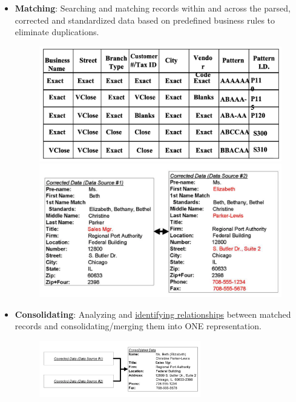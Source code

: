 \documentclass[10pt,a4paper]{article}
\begin{document}
\begin{itemize}
 \pagebreak
	\item \textbf{Matching}: Searching and matching records within and across the parsed, corrected and standardized data based on predefined business rules to eliminate duplications.
	 \begin{figure}[h!]
\begin{minipage}{.5\textwidth}
  \centering
  \includegraphics[width=.8\linewidth]{images/step-matching}
\end{minipage}%
\begin{minipage}{.5\textwidth}
  \centering
  \includegraphics[width=.8\linewidth]{images/step-matching-2}
\end{minipage}
\end{figure}
	\item \textbf{Consolidating}: Analyzing and \uline{identifying relationships} between matched records and consolidating/merging them into ONE representation.
	\begin{figure}[ht!]
 \hfill \includegraphics[width=200pt]{images/step-consolidating}
 \hspace*{\fill}
 \end{figure} 
\end{itemize}
\end{document}
